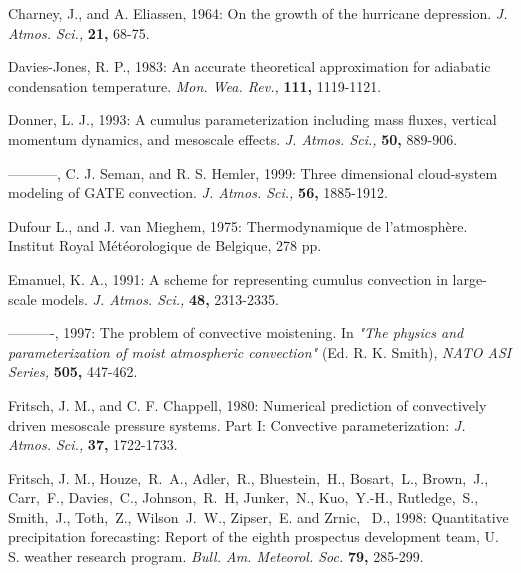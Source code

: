 
\por
Charney, J., and A. Eliassen, 1964: On the growth of the hurricane
depression. {\it J. Atmos. Sci.,} {\bf 21,} 68-75.


\por
Davies-Jones, R. P., 1983: An accurate theoretical approximation for
adiabatic condensation temperature. {\it Mon. Wea. Rev.,}
{\bf 111,} 1119-1121.

\por
Donner, L. J., 1993: A cumulus parameterization including mass fluxes,
vertical momentum dynamics, and mesoscale effects.
{\it J. Atmos. Sci.,} {\bf 50,} 889-906.

\por
-----------, C. J. Seman, and R. S. Hemler, 1999: Three dimensional cloud-system
modeling of GATE convection. {\it J. Atmos. Sci.,} {\bf 56,} 1885-1912.

\por
Dufour L., and J. van Mieghem, 1975: Thermodynamique de
l'atmosph\`ere. Institut Royal M\'et\'eorologique de Belgique, 278 pp.

\por
Emanuel, K. A., 1991: A scheme for representing cumulus convection in
large-scale models. {\it J. Atmos. Sci.,} {\bf 48,} 2313-2335.

\por
----------, 1997:
The problem of convective moistening.
In {\it "The physics and parameterization of moist atmospheric convection"}
(Ed. R. K. Smith), {\it NATO ASI Series,} {\bf 505,} 447-462.
%

\por
Fritsch, J. M., and C. F. Chappell, 1980: Numerical prediction of
convectively driven mesoscale pressure systems. Part I:
Convective parameterization: {\it J. Atmos. Sci.,} {\bf 37,} 1722-1733.

\por
Fritsch, J. M., Houze,~R.~A., Adler,~R., Bluestein,~H., Bosart,~L.,
Brown,~J., Carr,~F., Davies,~C., Johnson,~R.~H, Junker,~N., Kuo,~Y.-H.,
Rutledge,~S., Smith,~J., Toth,~Z., Wilson~J.~W., Zipser,~E. and Zrnic,~ D.,
1998:
Quantitative precipitation forecasting: Report of the eighth prospectus
development team, U. S. weather research program.
{\it Bull. Am. Meteorol. Soc.} {\bf 79,} 285-299.


